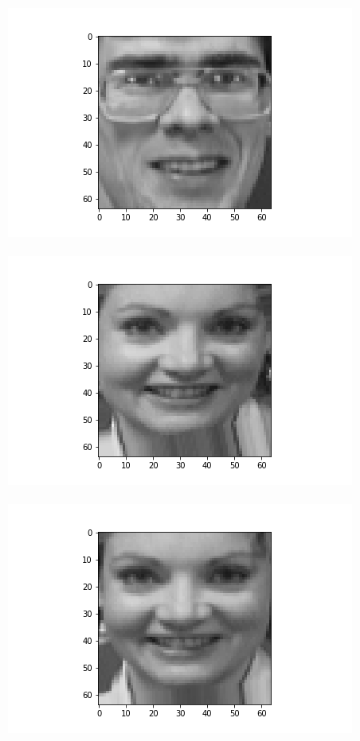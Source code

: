 \documentclass[12pt, a4paper]{article}
\begin{document}
\begin{figure}[h]
\begin{subfigure}{0.3\linewidth}
    \end{subfigure}
    \newline
    \begin{subfigure}{0.3\linewidth}
        \centering
        \includegraphics[width=\linewidth]{images/q3/c/5/3.png}
    \end{subfigure}
    \hfill
    \begin{subfigure}{0.3\linewidth}
        \centering
        \includegraphics[width=\linewidth]{images/q3/c/5/4.png}
    \end{subfigure}
    \hfill
    \begin{subfigure}{0.3\linewidth}
        \centering
        \includegraphics[width=\linewidth]{images/q3/c/5/5.png}

\end{subfigure}
\end{figure}
\end{document}
